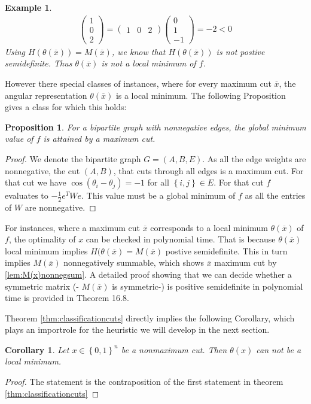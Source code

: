 \documentclass[12pt,a4paper]{article}
\theoremstyle{mythm}
\newtheorem{prop}[thm]{Proposition}
\newtheorem{cor}[thm]{Corollary}
\newtheorem*{exa}{Example}
\begin{document}
\begin{exa}
\begin{align*}
\begin{pmatrix}
1 \\ 
0 \\
2
\end{pmatrix} 
= 
\begin{pmatrix}
1 & 0 & 2
\end{pmatrix} 
\begin{pmatrix}
0 \\
1 \\ 
-1
\end{pmatrix} 
= -2 < 0
\end{align*} 
Using $ H ( \theta ( \overline{ x } ) )= M ( \overline{ x } ) $, we know that $ H ( \theta ( \overline{ x } ) ) $ is not postive semidefinite. Thus $ \theta ( \overline{ x } )
$ is not a local minimum of $ f $.
\end{exa} 
However there special classes of instances, where for every maximum cut $ \overline{ x }  $, the angular representation $ \theta ( \overline{ x } ) $ is a local minimum. 
The following Proposition gives a class for which this holds:
\begin{prop}
For a bipartite graph with nonnegative edges, the global minimum value of $ f $ is attained by a maximum cut.
\end{prop} 
\begin{proof}
We denote the bipartite graph $ G = \left( A,B,E \right)  $.
As all the edge weights are nonnegative, the cut $ ( A, B) $, that cuts through all edges is a maximum cut.
For that cut we have $ \cos( \theta _{ i } - \theta _j ) = -1 $ for all $ \left\{ i,j \right\} \in E $.
For that cut $ f $ evaluates to $ - \frac{ 1 }{ 2 } e ^T W e  $.
This value must be a global minimum of $ f $ as all the entries of $ W $ are nonnegative.
\end{proof}
For instances, where a maximum cut $ \overline{ x }  $ corresponds to a local minimum $ \theta ( \overline{ x } ) $ of $ f $, the optimality of $ x $ can be
checked in polynomial time. That is because $ \theta ( \overline{ x } ) $ local minimum implies $ H ( \theta ( \overline{ x } ) = M ( \overline{ x } ) $ postive
semidefinite. This in turn implies $ M ( \overline{ x } )  $ nonnegatively summable, which shows $ \overline{ x }  $ maximum cut by \ref{lem:M(x)nonnegsum}. 
A detailed proof showing that we can decide whether a symmetric matrix (- $ M ( \overline{ x } ) $ is symmetric-) is positive semidefinite in polynomial time is provided in \cite{Korte2018} Theorem 16.8.

Theorem \ref{thm:classificationcuts} directly implies the following Corollary, which plays an importrole for the heuristic we will develop in the next section.
\begin{cor}
Let $ x \in \left\{ 0,1 \right\} ^{ n } $ be a nonmaximum cut. Then $ \theta ( x )  $ can not be a local minimum.
\end{cor} 
\begin{proof}
The statement is the contraposition of the first statement in theorem \ref{thm:classificationcuts} 
\end{proof}
\newpage
\end{document}
